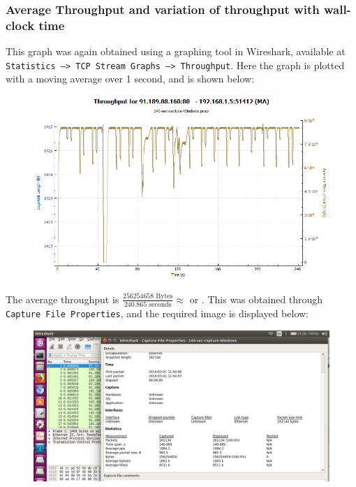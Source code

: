 \documentclass{article}
\begin{document}
\subsubsection{Average Throughput and variation of throughput with wall-clock time}
\begin{flushleft}
This graph was again obtained using a graphing tool in Wireshark, available at \texttt{Statistics --> TCP Stream Graphs --> Throughput}. Here the graph is plotted with a moving average over 1 second, and is shown below:
\begin{figure}[H]
\centering
\includegraphics[width=0.55\linewidth]{Throughput-variation-240-sec-capture-Windows.png}
\end{figure}

The average throughput is \(\frac{256254658 \text{ Bytes}}{240.865 \text{ seconds}} \approx \)  or . This was obtained through \texttt{Capture File Properties}, and the required image is displayed below:
\begin{figure}[H]
\centering
\includegraphics[width=0.55\linewidth]{Packet-capture-stats-240-sec-capture-Windows.png}
\end{figure}
\end{flushleft}
\end{document}
